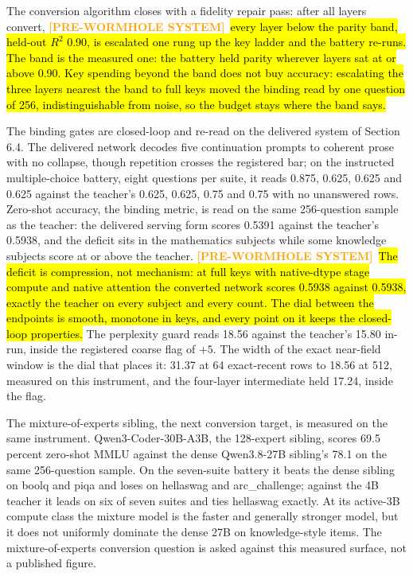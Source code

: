 \documentclass[11pt]{article}
\newcommand{\oldsystem}[1]{%
  {\sethlcolor{orange!25}\textcolor{orange}{\textbf{[PRE-WORMHOLE SYSTEM]}}~\hl{#1}}%
  \sethlcolor{yellow}}
\begin{document}
The conversion algorithm closes with a fidelity repair pass:
after all layers convert, \oldsystem{every layer below the parity band,
held-out $R^2$ 0.90, is escalated one rung up the key ladder and
the battery re-runs. The band is the measured one: the battery
held parity wherever layers sat at or above 0.90. Key spending
beyond the band does not buy accuracy: escalating the three
layers nearest the band to full keys moved the binding read by
one question of 256, indistinguishable from noise, so the budget
stays where the band says.}

The binding gates are closed-loop and re-read on the delivered
system of Section 6.4. The delivered network decodes five
continuation prompts to coherent prose with no collapse, though
repetition crosses the registered bar; on the instructed
multiple-choice battery, eight questions per suite, it reads
0.875, 0.625, 0.625 and 0.625 against the teacher's 0.625,
0.625, 0.75 and 0.75 with no unanswered rows. Zero-shot accuracy,
the binding metric, is read on the same
256-question sample as the teacher: the delivered serving form
scores 0.5391 against the teacher's 0.5938, and the deficit sits
in the mathematics subjects while some knowledge subjects score
at or above the teacher. \oldsystem{The deficit is compression,
not mechanism: at full keys with native-dtype stage compute and
native attention the converted network scores 0.5938 against
0.5938, exactly the teacher on every subject and every count.
The dial between the endpoints is smooth, monotone in keys, and
every point on it keeps the closed-loop properties.} The
perplexity guard reads 18.56 against the teacher's 15.80 in-run,
inside the registered coarse flag of $+5$. The width of the
exact near-field window is the dial that places it: 31.37 at 64
exact-recent rows to 18.56 at 512, measured on this instrument,
and the four-layer
intermediate held 17.24, inside the flag.

The mixture-of-experts sibling, the next conversion target, is
measured on the same instrument. Qwen3-Coder-30B-A3B, the
128-expert sibling, scores 69.5 percent zero-shot MMLU against the
dense Qwen3.8-27B sibling's 78.1 on the same 256-question sample.
On the seven-suite battery it beats the dense sibling on boolq and
piqa and loses on hellaswag and arc\_challenge; against the 4B
teacher it leads on six of seven suites and ties hellaswag exactly.
At its active-3B compute class the mixture model is the faster and
generally stronger model, but it does not uniformly dominate the
dense 27B on knowledge-style items. The mixture-of-experts
conversion question is asked against this measured surface, not a
published figure.
\end{document}
